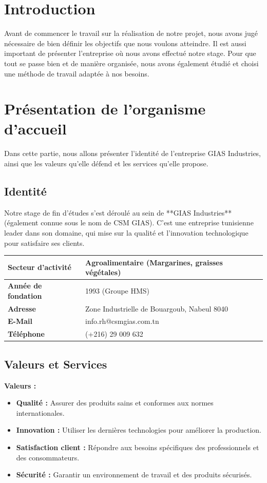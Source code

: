 \section{Introduction}
Avant de commencer le travail sur la réalisation de notre projet, nous avons jugé nécessaire de bien définir les objectifs que nous voulons atteindre. Il est aussi important de présenter l'entreprise où nous avons effectué notre stage. Pour que tout se passe bien et de manière organisée, nous avons également étudié et choisi une méthode de travail adaptée à nos besoins.

\section{Présentation de l'organisme d'accueil}
Dans cette partie, nous allons présenter l'identité de l'entreprise GIAS Industries, ainsi que les valeurs qu'elle défend et les services qu'elle propose.

\subsection{Identité}
Notre stage de fin d'études s'est déroulé au sein de **GIAS Industries** (également connue sous le nom de CSM GIAS). C'est une entreprise tunisienne leader dans son domaine, qui mise sur la qualité et l'innovation technologique pour satisfaire ses clients.

\begin{center}
\begin{tabular}{|l|p{10cm}|}
\hline
\textbf{Secteur d'activité} & Agroalimentaire (Margarines, graisses végétales) \\ \hline
\textbf{Année de fondation} & 1993 (Groupe HMS) \\ \hline
\textbf{Adresse} & Zone Industrielle de Bouargoub, Nabeul 8040 \\ \hline
\textbf{E-Mail} & info.rh@csmgias.com.tn \\ \hline
\textbf{Téléphone} & (+216) 29 009 632 \\ \hline
\end{tabular}
\end{center}

\subsection{Valeurs et Services}

\textbf{Valeurs :}
\begin{itemize}
    \item \textbf{Qualité :} Assurer des produits sains et conformes aux normes internationales.
    \item \textbf{Innovation :} Utiliser les dernières technologies pour améliorer la production.
    \item \textbf{Satisfaction client :} Répondre aux besoins spécifiques des professionnels et des consommateurs.
    \item \textbf{Sécurité :} Garantir un environnement de travail et des produits sécurisés.
\end{itemize}

